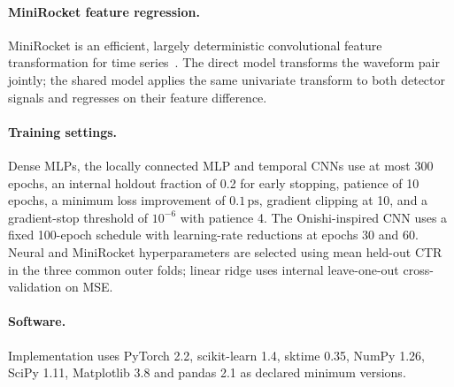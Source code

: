 \paragraph{MiniRocket feature regression.}
MiniRocket is an efficient, largely deterministic convolutional feature
transformation for time series~\cite{minirocket2021}. The direct model
transforms the waveform pair jointly; the shared model applies the same
univariate transform to both detector signals and regresses on their feature
difference.

\paragraph{Training settings.}
Dense MLPs, the locally connected MLP and temporal CNNs use at most 300 epochs,
an internal holdout fraction of 0.2 for early stopping, patience of 10 epochs,
a minimum loss improvement of $0.1\,\mathrm{ps}$, gradient clipping at 10,
and a gradient-stop threshold of $10^{-6}$ with patience 4. The
Onishi-inspired CNN uses a fixed 100-epoch schedule with learning-rate
reductions at epochs 30 and 60. Neural and MiniRocket hyperparameters are
selected using mean held-out CTR in the three common outer folds; linear ridge
uses internal leave-one-out cross-validation on MSE.



\paragraph{Software.}
Implementation uses PyTorch 2.2, scikit-learn 1.4, sktime 0.35, NumPy 1.26,
SciPy 1.11, Matplotlib 3.8 and pandas 2.1 as declared minimum versions.
